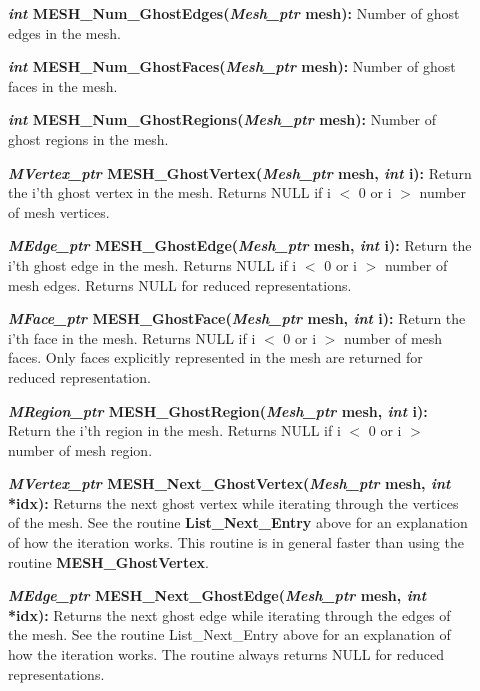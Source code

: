 \documentclass[12pt]{article}
\begin{document}
\begin{description}
  \item[]{\bf {\em int} MESH\_Num\_GhostEdges({\em Mesh\_ptr} mesh):}
    Number of ghost edges in the mesh.

  \item[]{\bf {\em int} MESH\_Num\_GhostFaces({\em Mesh\_ptr} mesh):}
    Number of ghost faces in the mesh. 

  \item[]{\bf {\em int} MESH\_Num\_GhostRegions({\em Mesh\_ptr} mesh):}
    Number of ghost regions in the mesh.

  \item[]

  \item[]{\bf {\em MVertex\_ptr} MESH\_GhostVertex({\em Mesh\_ptr} mesh,
      {\em int} i):} Return the i'th ghost vertex in the mesh. Returns NULL if i
    $<$ 0 or i $>$ number of mesh vertices.

  \item[]{\bf {\em MEdge\_ptr} MESH\_GhostEdge({\em Mesh\_ptr} mesh,
      {\em int} i):} Return the i'th ghost edge in the mesh. Returns NULL if i $<$
    0 or i $>$ number of mesh edges. Returns NULL for reduced
    representations.

  \item[]{\bf {\em MFace\_ptr} MESH\_GhostFace({\em Mesh\_ptr} mesh,
      {\em int} i):} Return the i'th face in the mesh. Returns NULL if i $<$
    0 or i $>$ number of mesh faces. Only faces explicitly represented in
    the mesh are returned for reduced representation.

  \item[]{\bf {\em MRegion\_ptr} MESH\_GhostRegion({\em Mesh\_ptr} mesh, {\em
        int} i):} Return the i'th region in the mesh. Returns NULL if i
    $<$ 0 or i $>$ number of mesh region.

  \item[]

  \item[]{\bf {\em MVertex\_ptr} MESH\_Next\_GhostVertex({\em Mesh\_ptr}
      mesh, {\em int} *idx):} Returns the next ghost vertex while iterating
    through the vertices of the mesh. See the routine {\bf
      List\_Next\_Entry} above for an explanation of how the iteration
    works. This routine is in general faster than using the routine {\bf
      MESH\_GhostVertex}.

  \item[]{\bf {\em MEdge\_ptr} MESH\_Next\_GhostEdge({\em Mesh\_ptr} mesh,
      {\em int} *idx):} Returns the next ghost edge while iterating through the
    edges of the mesh. See the routine List\_Next\_Entry above for an
    explanation of how the iteration works.  The routine always returns
    NULL for reduced representations.


\end{description}
\end{document}
